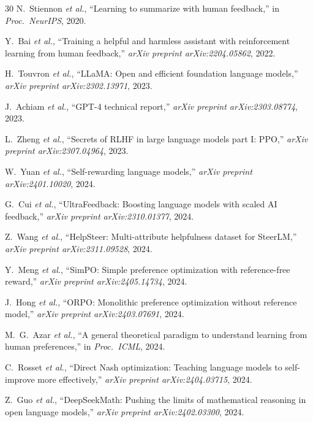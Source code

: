 \begin{thebibliography}{30}
N.~Stiennon \textit{et al.}, ``Learning to summarize with human feedback,'' in \textit{Proc.\ NeurIPS}, 2020.

Y.~Bai \textit{et al.}, ``Training a helpful and harmless assistant with reinforcement learning from human feedback,'' \textit{arXiv preprint arXiv:2204.05862}, 2022.

H.~Touvron \textit{et al.}, ``LLaMA: Open and efficient foundation language models,'' \textit{arXiv preprint arXiv:2302.13971}, 2023.

J.~Achiam \textit{et al.}, ``GPT-4 technical report,'' \textit{arXiv preprint arXiv:2303.08774}, 2023.

L.~Zheng \textit{et al.}, ``Secrets of RLHF in large language models part I: PPO,'' \textit{arXiv preprint arXiv:2307.04964}, 2023.

W.~Yuan \textit{et al.}, ``Self-rewarding language models,'' \textit{arXiv preprint arXiv:2401.10020}, 2024.

G.~Cui \textit{et al.}, ``UltraFeedback: Boosting language models with scaled AI feedback,'' \textit{arXiv preprint arXiv:2310.01377}, 2024.

Z.~Wang \textit{et al.}, ``HelpSteer: Multi-attribute helpfulness dataset for SteerLM,'' \textit{arXiv preprint arXiv:2311.09528}, 2024.

Y.~Meng \textit{et al.}, ``SimPO: Simple preference optimization with reference-free reward,'' \textit{arXiv preprint arXiv:2405.14734}, 2024.

J.~Hong \textit{et al.}, ``ORPO: Monolithic preference optimization without reference model,'' \textit{arXiv preprint arXiv:2403.07691}, 2024.

M.~G.~Azar \textit{et al.}, ``A general theoretical paradigm to understand learning from human preferences,'' in \textit{Proc.\ ICML}, 2024.

C.~Rosset \textit{et al.}, ``Direct Nash optimization: Teaching language models to self-improve more effectively,'' \textit{arXiv preprint arXiv:2404.03715}, 2024.

Z.~Guo \textit{et al.}, ``DeepSeekMath: Pushing the limits of mathematical reasoning in open language models,'' \textit{arXiv preprint arXiv:2402.03300}, 2024.


\end{thebibliography}
